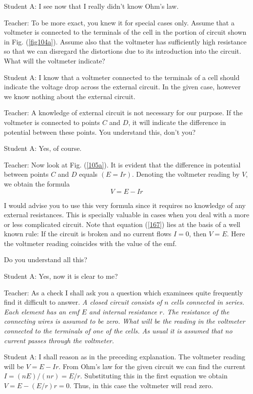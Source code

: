 \documentclass[a4paper,12pt]{book}
\begin{document}
{\sc Student A:} I see now that I really didn't know Ohm's law. 

{\sc Teacher:} To be more exact, you knew it for special cases only. Assume that a voltmeter is connected to the terminals of the cell in the portion of circuit shown in Fig. (\ref{fig104a}). Assume also that the voltmeter has sufficiently high resistance so that we can disregard the distortions due to its introduction into the circuit. What will the voltmeter indicate?

{\sc Student A:} I know that a voltmeter connected to the terminals of a cell should indicate the voltage drop across the external circuit. In the given case, however we know nothing about the external circuit.

{\sc Teacher:} A knowledge of external circuit is not necessary for our purpose. If the voltmeter is connected to points $C$ and $D$, it will indicate the difference in potential between these points. You understand this, don't you?

{\sc Student A:} Yes, of course.

{\sc Teacher:} Now look at Fig. (\ref{105a}). It is evident that the difference in potential between points $C$ and $D$ equals $(E = Ir)$. Denoting the voltmeter reading by $V$, we obtain the formula 
\begin{equation}
V = E - Ir \label{167}
\end{equation}

I would advise you to use this very formula since it requires no knowledge of any external resistances. This is specially valuable in cases when you deal with a more or less complicated circuit. Note that equation (\ref{167}) lies at the basis of a well known rule: If the circuit is broken and no current flows $I = 0$, then $V =E$. Here the voltmeter reading coincides with the value of the emf. 

Do you understand all this?

{\sc Student A:} Yes, now it is clear to me?

{\sc Teacher:}  As a check I shall ask you a question which examinees quite frequently find it difficult to answer. \emph{ A closed circuit consists of $n$ cells connected in series. Each element has an emf $E$ and internal resistance $r$. The resistance of the connecting wires is assumed to be zero. What will be the reading in the voltmeter connected to the terminals of one of the cells. As usual it is assumed that no current passes through the voltmeter.}

{\sc Student A:} I shall reason as in the preceding explanation. The voltmeter reading will be $V = E -Ir$. From Ohm's law for the given circuit we can find the current $I = (nE)/(nr) = E/r$. Substituting this in the first equation we obtain $V = E - (E/r)r = 0$. Thus, in this case the voltmeter will read zero.
\end{document}
